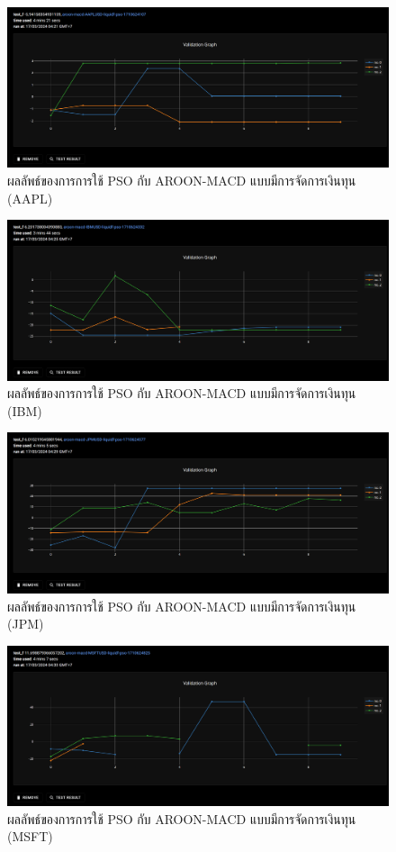 \begin{figure}[ht]
    \centering
    \includegraphics[width=\textwidth]{images/pso/aroon-macd/aapl-liquid.png}
    \caption{ผลลัพธ์ของการการใช้ PSO กับ AROON-MACD แบบมีการจัดการเงินทุน (AAPL)}
\end{figure}
\begin{figure}[ht]
    \centering
    \includegraphics[width=\textwidth]{images/pso/aroon-macd/ibm-liquid.png}
    \caption{ผลลัพธ์ของการการใช้ PSO กับ AROON-MACD แบบมีการจัดการเงินทุน (IBM)}
\end{figure}
\begin{figure}[ht]
    \centering
    \includegraphics[width=\textwidth]{images/pso/aroon-macd/jpm-liquid.png}
    \caption{ผลลัพธ์ของการการใช้ PSO กับ AROON-MACD แบบมีการจัดการเงินทุน (JPM)}
\end{figure}
\begin{figure}[ht]
    \centering
    \includegraphics[width=\textwidth]{images/pso/aroon-macd/msft-liquid.png}
    \caption{ผลลัพธ์ของการการใช้ PSO กับ AROON-MACD แบบมีการจัดการเงินทุน (MSFT)}
\end{figure}
